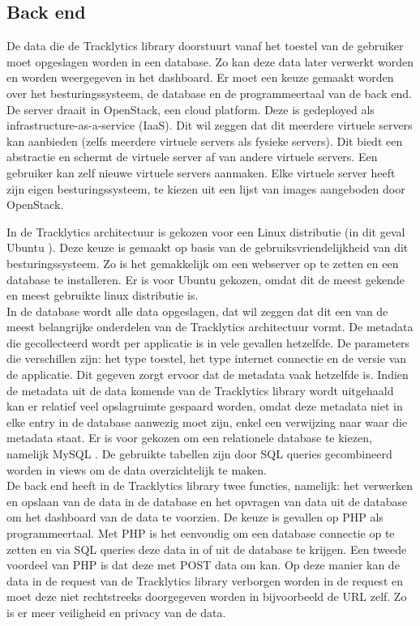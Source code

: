 \subsection{Back end}
De data die de Tracklytics library doorstuurt vanaf het toestel van de gebruiker moet opgeslagen worden in een database. Zo kan deze data later verwerkt worden en worden weergegeven in het dashboard. Er moet een keuze gemaakt worden over het besturingssysteem, de database en de programmeertaal van de back end.\\

De server draait in OpenStack, een cloud platform. Deze is gedeployed als infrastructure-as-a-service (IaaS). Dit wil zeggen dat dit meerdere virtuele servers kan aanbieden (zelfs meerdere virtuele servers als fysieke servers). Dit biedt een abstractie en schermt de virtuele server af van andere virtuele servers. Een gebruiker kan zelf nieuwe virtuele servers aanmaken. Elke virtuele server heeft zijn eigen besturingssysteem, te kiezen uit een lijst van images aangeboden door OpenStack\cite{OpenStack}.

In de Tracklytics architectuur is gekozen voor een Linux distributie (in dit geval Ubuntu \cite{Ubuntu}). Deze keuze is gemaakt op basis van de gebruiksvriendelijkheid van dit besturingssysteem. Zo is het gemakkelijk om een webserver op te zetten en een database te installeren. Er is voor Ubuntu gekozen, omdat dit de meest gekende en meest gebruikte linux distributie is. \\

In de database wordt alle data opgeslagen, dat wil zeggen dat dit een van de meest belangrijke onderdelen van de Tracklytics architectuur vormt. De metadata die gecollecteerd wordt per applicatie is in vele gevallen hetzelfde. De parameters die verschillen zijn: het type toestel, het type internet connectie en de versie van de applicatie. Dit gegeven zorgt ervoor dat de metadata vaak hetzelfde is. Indien de metadata uit de data komende van de Tracklytics library wordt uitgehaald kan er relatief veel opslagruimte gespaard worden, omdat deze metadata niet in elke entry in de database aanwezig moet zijn, enkel een verwijzing naar waar die metadata staat. Er is voor gekozen om een relationele database te kiezen, namelijk MySQL \cite{MySQL}. De gebruikte tabellen zijn door SQL queries gecombineerd worden in views om de data overzichtelijk te maken. \\

De back end heeft in de Tracklytics library twee functies, namelijk: het verwerken en opslaan van de data in de database en het opvragen van data uit de database om het dashboard van de data te voorzien. De keuze is gevallen op PHP \cite{PHP} als programmeertaal. Met PHP is het eenvoudig om een database connectie op te zetten en via SQL queries deze data in of uit de database te krijgen. Een tweede voordeel van PHP is dat deze met POST data om kan. Op deze manier kan de data in de request van de Tracklytics library verborgen worden in de request en moet deze niet rechtstreeks doorgegeven worden in bijvoorbeeld de URL zelf. Zo is er meer veiligheid en privacy van de data. \\

